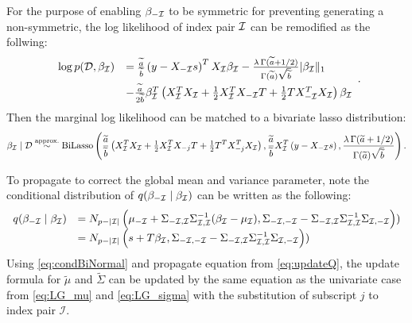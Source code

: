 For the purpose of enabling $\beta_{-{\mathcal I}}$ to be symmetric for preventing generating a non-symmetric, the log likelihood of index pair ${\mathcal I}$ can be remodified as the follwing:
\begin{equation}
	\begin{array}{rl} 
		\log p(\mathcal{D},\beta_{\mathcal I}) 
		&  =  \frac{\widetilde{a}}{\widetilde{b}} \left( y - X_{-{\mathcal I}}s \right)^T X_{\mathcal I} \beta_{\mathcal I}
		- \frac{\lambda\,\Gamma(\widetilde{a}+1/2)}{\Gamma(\widetilde{a})\sqrt{\widetilde{b}}} |\beta_{\mathcal I}\|_1
		\\ [2ex]
		& 
		- \frac{\widetilde{a}}{2\widetilde{b}} \beta_{\mathcal I}^T \left( X_{\mathcal I}^TX_{\mathcal I} + \tfrac{1}{2}X_{\mathcal I}^TX_{-{\mathcal I}}T 
		+ \tfrac{1}{2}T X_{-{\mathcal I}}^TX_{\mathcal I}
		\right)\beta_{\mathcal I}
		
	\end{array}.
\end{equation}
Then the marginal log likelihood can be matched to a bivariate lasso distribution:
\begin{equation}
	\beta_{{\mathcal I}}\mid\mathcal{D} 
	\stackrel{\mbox{\scriptsize approx.}}{\sim} 
	\mbox{BiLasso}\left(
	\frac{\widetilde{a}}{\widetilde{b}} \left(X_{\mathcal I}^TX_{\mathcal I} + \tfrac{1}{2}X_{\mathcal I}^TX_{-j}T + \tfrac{1}{2}T^T X_{-j}^T X_{\mathcal I} \right),
	\frac{\widetilde{a}}{\widetilde{b}} X_{\mathcal I}^T\left( y - X_{-{\mathcal I}}s \right),
	\frac{\lambda\,\Gamma(\widetilde{a}+1/2)}{\Gamma(\widetilde{a})\sqrt{\widetilde{b}}} 
	\right).
\end{equation}

To propagate to correct the global mean and variance parameter, note the conditional distribution of $q(\beta_{-{\mathcal I}}\mid\beta_{\mathcal I})$ can be written as the following:
\begin{equation}
	\begin{array}{rl}
		q(\beta_{-{\mathcal I}}\mid\beta_{\mathcal I}) 
		& = N_{p-|{\mathcal I}|}\left( \mu_{-{\mathcal I}} +\Sigma_{-{\mathcal I},{\mathcal I}} \Sigma_{{\mathcal I},{\mathcal I}}^{-1}(\beta_{\mathcal I} - \mu_{\mathcal I}), \Sigma_{-{\mathcal I},-{\mathcal I}} - \Sigma_{-{\mathcal I},{\mathcal I}}\Sigma_{{\mathcal I},{\mathcal I}}^{-1}\Sigma_{{\mathcal I},-{\mathcal I}}  \right)) 
		\\ 
		& = N_{p-|{\mathcal I}|}\left( s  + T \beta_{{\mathcal I}}, \Sigma_{-{\mathcal I},-{\mathcal I}} - \Sigma_{-{\mathcal I},{\mathcal I}}\Sigma_{{\mathcal I},{\mathcal I}}^{-1}\Sigma_{{\mathcal I},-{\mathcal I}}  \right))
	\end{array} 
	\label{eq:condBiNormal}
\end{equation}
Using \autoref{eq:condBiNormal} and propagate equation from \autoref{eq:updateQ}, the update formula for $\tilde{\mu}$ and $\tilde{\Sigma}$ can be updated by the same equation as the univariate case from \autoref{eq:LG_mu} and \autoref{eq:LG_sigma} with the substitution of subscript $j$ to index pair $\mathcal{I}$.

